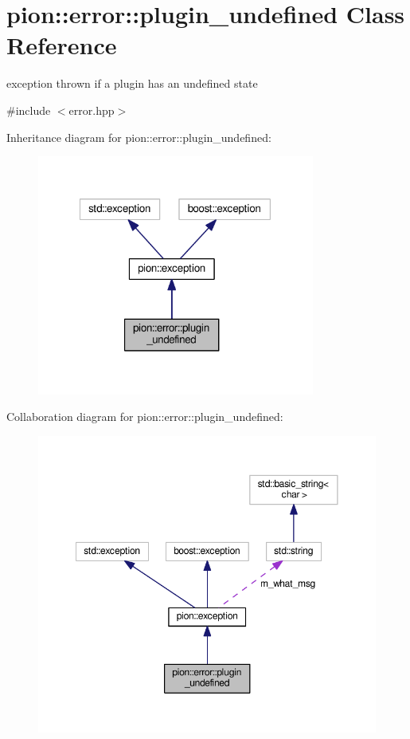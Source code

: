 \hypertarget{classpion_1_1error_1_1plugin__undefined}{\section{pion\-:\-:error\-:\-:plugin\-\_\-undefined Class Reference}
\label{classpion_1_1error_1_1plugin__undefined}
}


exception thrown if a plugin has an undefined state  




{\ttfamily \#include $<$error.\-hpp$>$}



Inheritance diagram for pion\-:\-:error\-:\-:plugin\-\_\-undefined\-:
\nopagebreak
\begin{figure}[H]
\begin{center}
\leavevmode
\includegraphics[width=259pt]{classpion_1_1error_1_1plugin__undefined__inherit__graph}
\end{center}
\end{figure}


Collaboration diagram for pion\-:\-:error\-:\-:plugin\-\_\-undefined\-:
\nopagebreak
\begin{figure}[H]
\begin{center}
\leavevmode
\includegraphics[width=350pt]{classpion_1_1error_1_1plugin__undefined__coll__graph}
\end{center}
\end{figure}
